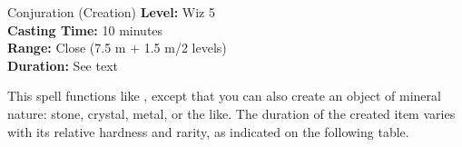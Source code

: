 {Conjuration (Creation)}
{
	\textbf{Level:}
	Wiz 5\\
	\textbf{Casting Time:}
	10 minutes\\
	\textbf{Range:}
	Close (7.5 m + 1.5 m/2 levels)\\
	\textbf{Duration:}
	See text\\
}
{
	This spell functions like , except that you can also create an object of mineral nature: stone, crystal, metal, or the like. The duration of the created item varies with its relative hardness and rarity, as indicated on the following table.


}
